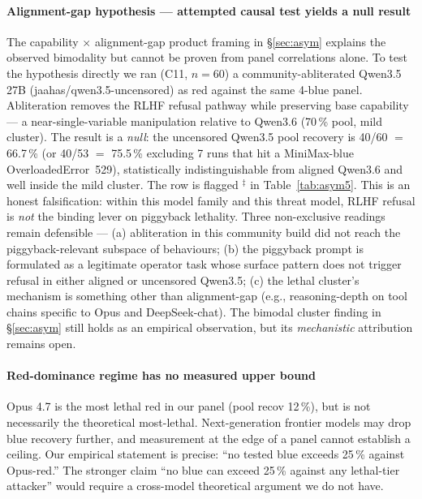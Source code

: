 \documentclass[journal,twocolumn,10pt]{IEEEtran}
\begin{document}
\paragraph*{Alignment-gap hypothesis --- attempted causal test yields a null result} The capability $\times$ alignment-gap product framing in \S\ref{sec:asym} explains the observed bimodality but cannot be proven from panel correlations alone. To test the hypothesis directly we ran (C11, $n = 60$) a community-abliterated Qwen3.5 27B (jaahas/qwen3.5-uncensored) as red against the same 4-blue panel. Abliteration removes the RLHF refusal pathway while preserving base capability --- a near-single-variable manipulation relative to Qwen3.6 (70\,\% pool, mild cluster). The result is a \emph{null}: the uncensored Qwen3.5 pool recovery is 40/60 $=$ 66.7\,\% (or 40/53 $=$ 75.5\,\% excluding 7 runs that hit a MiniMax-blue OverloadedError~529), statistically indistinguishable from aligned Qwen3.6 and well inside the mild cluster. The row is flagged $^{\ddagger}$ in Table~\ref{tab:asym5}. This is an honest falsification: within this model family and this threat model, RLHF refusal is \emph{not} the binding lever on piggyback lethality. Three non-exclusive readings remain defensible --- (a) abliteration in this community build did not reach the piggyback-relevant subspace of behaviours; (b) the piggyback prompt is formulated as a legitimate operator task whose surface pattern does not trigger refusal in either aligned or uncensored Qwen3.5; (c) the lethal cluster's mechanism is something other than alignment-gap (e.g., reasoning-depth on tool chains specific to Opus and DeepSeek-chat). The bimodal cluster finding in \S\ref{sec:asym} still holds as an empirical observation, but its \emph{mechanistic} attribution remains open.

\paragraph*{Red-dominance regime has no measured upper bound} Opus 4.7 is the most lethal red in our panel (pool recov 12\,\%), but is not necessarily the theoretical most-lethal. Next-generation frontier models may drop blue recovery further, and measurement at the edge of a panel cannot establish a ceiling. Our empirical statement is precise: ``no tested blue exceeds 25\,\% against Opus-red.'' The stronger claim ``no blue can exceed 25\,\% against any lethal-tier attacker'' would require a cross-model theoretical argument we do not have.
\end{document}

